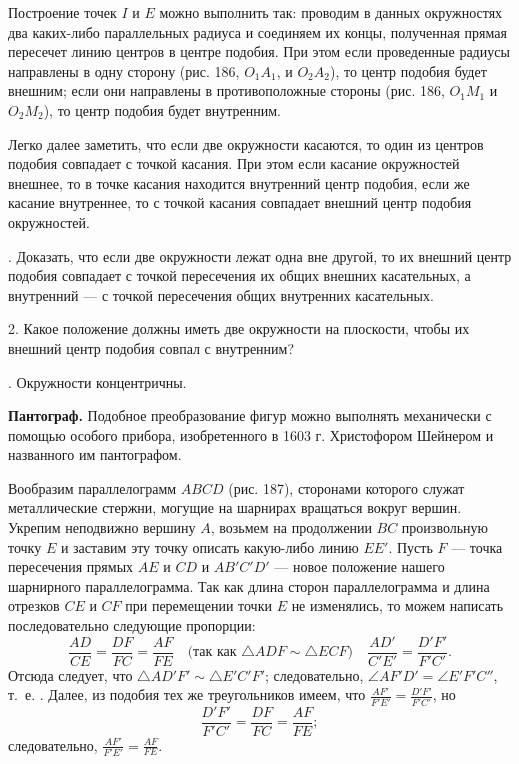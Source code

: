 \documentclass[oneside]{book}
\begin{document}
Построение точек $I$ и $E$ можно выполнить так:
проводим в данных окружностях два каких-либо параллельных радиуса и соединяем их концы, полученная прямая пересечет линию центров в центре подобия.
При этом если проведенные радиусы направлены в одну сторону (рис. 186, $O_1A_1$, и $O_2A_2$), то центр подобия будет внешним;
если они направлены в противоположные стороны (рис. 186, $O_1M_1$ и $O_2M_2$), то центр подобия будет внутренним.

Легко далее заметить, что если две окружности касаются, то один из центров подобия совпадает с точкой касания.
При этом если касание окружностей внешнее, то в точке касания находится внутренний центр подобия, если же касание внутреннее, то с точкой касания совпадает внешний центр подобия окружностей.

.
Доказать, что если две окружности лежат одна вне другой, то их внешний центр подобия совпадает с точкой пересечения их общих внешних касательных, а внутренний — с точкой пересечения общих внутренних касательных.

2.
Какое положение должны иметь две окружности на плоскости, чтобы их внешний центр подобия совпал с внутренним? 

.
Окружности концентричны.

\textbf{Пантограф.}
Подобное преобразование фигур можно выполнять механически с помощью особого прибора, изобретенного в 1603 г.
Христофором Шейнером и названного им пантографом.

Вообразим параллелограмм $ABCD$ (рис. 187), сторонами которого служат металлические стержни, могущие на шарнирах вращаться вокруг вершин.
Укрепим неподвижно вершину $A$, возьмем на продолжении $BC$ произвольную точку $E$ и заставим эту точку описать какую-либо линию $EE'$.
Пусть $F$ — точка пересечения прямых $AE$ и $CD$ и $AB'C'D'$ — новое положение нашего шарнирного параллелограмма.
Так как длина сторон параллелограмма и длина отрезков $CE$ и $CF$ при перемещении точки $E$ не изменялись, то можем написать последовательно следующие пропорции:
\[\frac{AD}{CE}=\frac{DF}{FC}=\frac{AF}{FE}
\quad\text{(так как $\triangle ADF\sim\triangle ECF$)}\quad
\frac{AD'}{C'E'}=\frac{D'F'}{F'C'}.\]
Отсюда следует, что $\triangle AD'F'\sim\triangle  E'C'F'$;
следовательно, $\angle AF'D'=\angle E'F'C''$, т.~е.
.
Далее, из подобия тех  же треугольников имеем, что $\frac{AF'}{F'E'}=\frac{D'F'}{F'C'}$, но
\[\frac{D'F'}{F'C'}=\frac{DF}{FC}=\frac{AF}{FE};\]
следовательно, $\frac{AF'}{F'E'}=\frac{AF}{FE}$.
\end{document}

